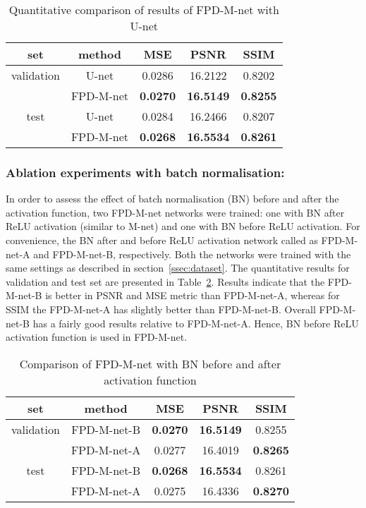 \documentclass{llncs}
\begin{document}
\begin{table}[h!]
\centering
\addtolength{\tabcolsep}{10pt}
\begin{tabular}{ c | c | c | c | c }
    \hline \hline
    set        & method    & MSE    & PSNR    & SSIM   \\ \hline \hline
    validation & U-net     & 0.0286 & 16.2122 & 0.8202 \\
               & FPD-M-net & \textbf{0.0270} & \textbf{16.5149} & \textbf{0.8255} \\
    \hline
    test       & U-net     & 0.0284 & 16.2466 & 0.8207 \\
               & FPD-M-net & \textbf{0.0268} & \textbf{16.5534} & \textbf{0.8261} \\ \hline\hline
\end{tabular}
\caption{Quantitative comparison of results of FPD-M-net with U-net}
\label{table:unetcmp}
\end{table}

\subsubsection{Ablation experiments with batch normalisation:}
\label{sssec:BN}
In order to assess the effect of batch normalisation (BN) before and after the activation function, two FPD-M-net networks were trained: one with BN after ReLU activation (similar to M-net) and one with BN before ReLU activation. For convenience, the BN after and before ReLU activation network called as FPD-M-net-A and FPD-M-net-B, respectively. Both the networks were trained with the same settings as described in section~\ref{ssec:dataset}. The quantitative results for validation and test set are presented in Table~\ref{table:mnetcmp}. Results indicate that the FPD-M-net-B is better in PSNR and MSE metric than FPD-M-net-A, whereas for SSIM the FPD-M-net-A has slightly better than FPD-M-net-B. Overall FPD-M-net-B has a fairly good results relative to FPD-M-net-A. Hence, BN before ReLU activation function is used in FPD-M-net.

\vspace{-0.3cm}
\begin{table}[h!]
\centering
\addtolength{\tabcolsep}{10pt}
\begin{tabular}{ c | c | c | c | c }
    \hline \hline
    set        & method    & MSE    & PSNR    & SSIM   \\ \hline \hline
    validation & FPD-M-net-B & \textbf{0.0270} & \textbf{16.5149} & 0.8255 \\
               & FPD-M-net-A & 0.0277 & 16.4019 & \textbf{0.8265} \\
    \hline
    test       & FPD-M-net-B & \textbf{0.0268} & \textbf{16.5534} & 0.8261 \\
               & FPD-M-net-A & 0.0275 & 16.4336 & \textbf{0.8270} \\ \hline\hline
\end{tabular}
\caption{Comparison of FPD-M-net with BN before and after activation function}
\label{table:mnetcmp}
\end{table}
\vspace{-1.0cm}
\end{document}
